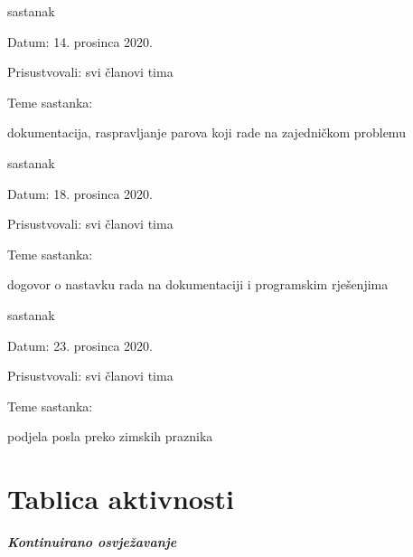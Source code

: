 \begin{packed_enum}
			\item  sastanak
			\item[] \begin{packed_item}
				\item Datum: 14. prosinca 2020. 
				\item Prisustvovali: svi članovi tima
				\item Teme sastanka:
				\begin{packed_item}
					\item  dokumentacija, raspravljanje parova koji rade na zajedničkom problemu
				\end{packed_item}
			\end{packed_item}
			
			\item  sastanak
			\item[] \begin{packed_item}
				\item Datum: 18. prosinca 2020. 
				\item Prisustvovali: svi članovi tima
				\item Teme sastanka:
				\begin{packed_item}
					\item  dogovor o nastavku rada na dokumentaciji i programskim rješenjima
				\end{packed_item}
			\end{packed_item}
			
			\item  sastanak
			\item[] \begin{packed_item}
				\item Datum: 23. prosinca 2020. 
				\item Prisustvovali: svi članovi tima
				\item Teme sastanka:
				\begin{packed_item}
					\item  podjela posla preko zimskih praznika
				\end{packed_item}
			\end{packed_item}
			
		\end{packed_enum}
		
		\eject
		\section*{Tablica aktivnosti}
		
			\textbf{\textit{Kontinuirano osvježavanje}}\\
			
